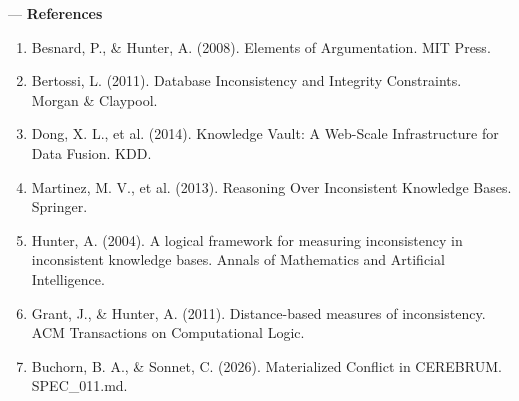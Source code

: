 \documentclass[10pt,journal,compsoc]{IEEEtran}
\begin{document}
---
\textbf{References}
\begin{enumerate}
\item Besnard, P., \& Hunter, A. (2008). Elements of Argume\-ntation. MIT Press.
\item Bertossi, L. (2011). Database Incons\-istency and Integrity Constraints. Morgan \& Claypool.
\item Dong, X. L., et al. (2014). Knowledge Vault: A Web-Scale Infras\-tructure for Data Fusion. KDD.
\item Martinez, M. V., et al. (2013). Reasoning Over Incons\-istent Knowledge Bases. Springer.
\item Hunter, A. (2004). A logical framework for measuring incon\-sistency in incon\-sistent knowledge bases. Annals of Mathematics and Artificial Intell\-igence.
\item Grant, J., \& Hunter, A. (2011). Distance-based measures of incon\-sistency. ACM Transa\-ctions on Comput\-ational Logic.
\item Buchorn, B. A., \& Sonnet, C. (2026). Materi\-alized Conflict in CEREBRUM. SPEC\_011.md.

\end{enumerate}



\end{document}
